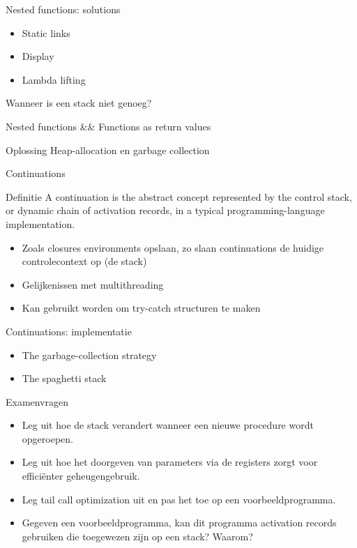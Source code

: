 \documentclass{beamer}
\begin{document}
\begin{frame}{Nested functions: solutions}
    \begin{itemize}
        \item Static links
        \item Display
        \item Lambda lifting
    \end{itemize}
\end{frame}

\begin{frame}{Wanneer is een stack niet genoeg?}
	\begin{block}{}
	    Nested functions \&\& Functions as return values
	\end{block}
	\begin{block}{Oplossing}
	    Heap-allocation en garbage collection
	\end{block}
\end{frame}

\begin{frame}{Continuations}
	\begin{block}{Definitie}
	    A continuation is the abstract concept represented by the control stack, or dynamic chain of activation records, in a typical programming-language implementation.
	\end{block}
	\begin{itemize}
	    \item Zoals closures environments opslaan, zo slaan continuations de huidige controlecontext op (de stack)
	    \item Gelijkenissen met multithreading
	    \item Kan gebruikt worden om try-catch structuren te maken
	\end{itemize}
\end{frame}

\begin{frame}{Continuations: implementatie}
	\begin{itemize}
	    \item The garbage-collection strategy
	    \item The spaghetti stack
	\end{itemize}
\end{frame}

\begin{frame}{Examenvragen}
    \begin{itemize}
        \item Leg uit hoe de stack verandert wanneer een nieuwe procedure wordt opgeroepen.
        \item Leg uit hoe het doorgeven van parameters via de registers zorgt voor efficiënter geheugengebruik.
        \item Leg tail call optimization uit en pas het toe op een voorbeeldprogramma.
        \item Gegeven een voorbeeldprogramma, kan dit programma activation records gebruiken die toegewezen zijn op een stack? Waarom?
    \end{itemize}
\end{frame}
\end{document}
